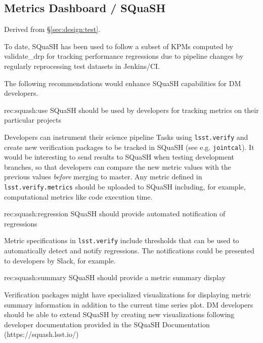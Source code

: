 \subsection{Metrics Dashboard / SQuaSH}
\label{sec:comp:squash}

Derived from \S\ref{sec:design:test}.


To date, SQuaSH has been used to follow a subset of KPMs computed by validate\_drp for tracking performance regressions due to pipeline changes by regularly reprocessing test datasets in Jenkins/CI.

The following recommendations would enhance SQuaSH capabilities for DM developers.

\begin{recommendation}
    {rec:squash:use}
    {SQuaSH should be used by developers for tracking metrics on their particular projects}
\end{recommendation}

Developers can instrument their science pipeline Tasks using \texttt{lsst.verify} and create new verification packages to be tracked in SQuaSH (see e.g. \texttt{jointcal}). It would be interesting to send results to SQuaSH when testing development branches, so that developers can compare the new metric values with the previous values \textit{before} merging to master. Any metric defined in \texttt{lsst.verify.metrics} should be uploaded to SQuaSH including, for example, computational metrics like code execution time.

\begin{recommendation}
    {rec:squash:regression}
    {SQuaSH should provide automated notification of regressions}
\end{recommendation}

Metric specifications in \texttt{lsst.verify} include thresholds that can be used to automatically detect and notify regressions. The notifications could be presented to developers by Slack, for example.

\begin{recommendation}
    {rec:squash:summary}
    {SQuaSH should provide a metric summary display}
\end{recommendation}

Verification packages might have specialized visualizations for displaying metric summary information in addition to the current time series plot. DM developers should be able to extend SQuaSH by creating new visualizations following developer documentation provided in the SQuaSH Documentation (https://squash.lsst.io/)

